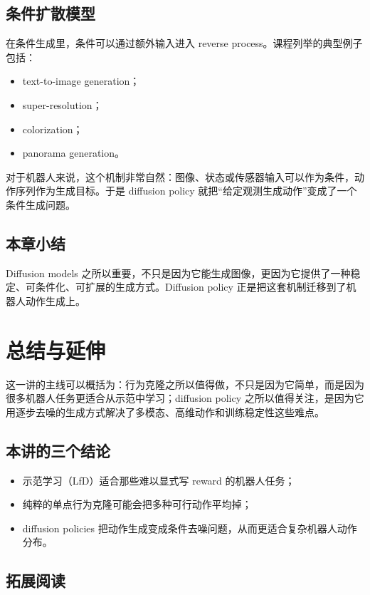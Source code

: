\documentclass[a4paper]{article}
\begin{document}
\subsection{条件扩散模型}

在条件生成里，条件可以通过额外输入进入 reverse process。课程列举的典型例子包括：
\begin{itemize}
  \item text-to-image generation；
  \item super-resolution；
  \item colorization；
  \item panorama generation。
\end{itemize}

对于机器人来说，这个机制非常自然：图像、状态或传感器输入可以作为条件，动作序列作为生成目标。于是 diffusion policy 就把“给定观测生成动作”变成了一个条件生成问题。

\subsection{本章小结}

Diffusion models 之所以重要，不只是因为它能生成图像，更因为它提供了一种稳定、可条件化、可扩展的生成方式。Diffusion policy 正是把这套机制迁移到了机器人动作生成上。

\section{总结与延伸}

这一讲的主线可以概括为：行为克隆之所以值得做，不只是因为它简单，而是因为很多机器人任务更适合从示范中学习；diffusion policy 之所以值得关注，是因为它用逐步去噪的生成方式解决了多模态、高维动作和训练稳定性这些难点。

\subsection{本讲的三个结论}

\begin{itemize}
  \item 示范学习（LfD）适合那些难以显式写 reward 的机器人任务；
  \item 纯粹的单点行为克隆可能会把多种可行动作平均掉；
  \item diffusion policies 把动作生成变成条件去噪问题，从而更适合复杂机器人动作分布。
\end{itemize}

\subsection{拓展阅读}
\end{document}
